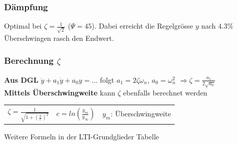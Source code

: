 \subsubsection{Dämpfung}
Optimal bei $\zeta=\frac{1}{\sqrt{2}}$ ($\Psi=45$).
Dabei erreicht die Regelgrösse $y$ nach $4.3\%$ Überschwingen rasch den	Endwert.

\subsubsection{Berechnung $\zeta$}
\textbf{Aus DGL} $\ddot{y}+a_1\dot{y}+a_0 y=\ldots$ folgt $a_1=2\zeta\omega_n$, 
$a_0=\omega_n^2$
$\Rightarrow \zeta=\frac{a_1}{2\sqrt{a_0}}$ \\
\textbf{Mittels Überschwingweite} kann $\zeta$ ebenfalls berechnet werden\\
\begin{tabular}{p{2.5cm}p{2.5cm}p{4cm}}
$\zeta = \frac{1}{\sqrt{1+(\frac{\pi}{c})^2}}$ & $c =ln(\frac{y_m}{y_{\infty}})$ & $y_m$: Überschwingweite
\end{tabular}

Weitere Formeln in der LTI-Grundglieder Tabelle
